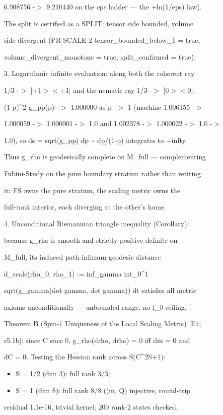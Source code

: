 \documentclass[11pt,a4paper]{article}
\theoremstyle{definition}
\begin{document}
   6.908756 -$>$ 9.210440 on the eps ladder — the +ln(1/eps) law).

   The split is certified as a SPLIT: tensor side bounded, volume

   side divergent (PR-SCALE-2 tensor\_bounded\_below\_1 = true,

   volume\_divergent\_monotone = true, split\_confirmed = true).

3. Logarithmic infinite evaluation: along both the coherent ray

   1/3 -$>$ |+1$>$$<$+1| and the nematic ray 1/3 -$>$ |0$>$$<$0|,

   (1-p)\^{}2 g\_pp(p) -$>$ 1.000000 as p -$>$ 1 (machine 1.006155 -$>$

   1.000059 -$>$ 1.000001 -$>$ 1.0 and 1.002378 -$>$ 1.000022 -$>$ 1.0 -$>$

   1.0), so ds = sqrt(g\_pp) dp \textasciitilde{} dp/(1-p) integrates to +infty.

   Thus g\_rho is geodesically complete on M\_full — complementing

   Fubini-Study on the pure boundary stratum rather than retiring

   it: FS owns the pure stratum, the scaling metric owns the

   full-rank interior, each diverging at the other's home.

4. Unconditional Riemannian triangle inequality (Corollary):

   because g\_rho is smooth and strictly positive-definite on

   M\_full, its induced path-infimum geodesic distance

   d\_scale(rho\_0, rho\_1) := inf\_gamma int\_0\^{}1

   sqrt(g\_gamma(dot gamma, dot gamma)) dt satisfies all metric

   axioms unconditionally — unbounded range, no l\_0 ceiling.


Theorem B (Spin-1 Uniqueness of the Local Scaling Metric) [E4;

r5.1b]: since C succ 0, g\_rho(drho, drho) = 0 iff dm = 0 and

dC = 0. Testing the Hessian rank across S(C\^{}{2S+1}):


\begin{itemize}[leftmargin=1.4em]
\item S = 1/2 (dim 3): full rank 3/3;
\item S = 1 (dim 8): full rank 8/8 ((m, Q) injective, round-trip
\end{itemize}
    residual 1.1e-16, trivial kernel; 200 rank-2 states checked,
\end{document}
